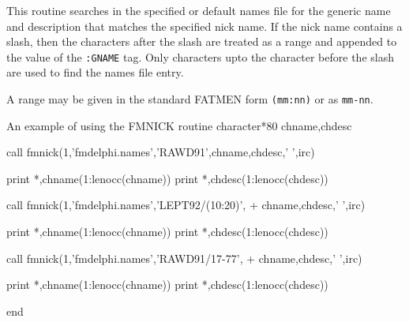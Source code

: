 This routine searches in the specified or default names file
for the generic name and description that matches the specified
nick name. If the nick name contains a slash, then the characters
after the slash are treated as a range and appended to the 
value of the {\tt :GNAME} tag. Only characters upto the character
before the slash are used to find the names file entry.

A range may be given in the standard FATMEN form {\tt (mm:nn)}
or as {\tt mm-nn}.

\begin{XMPt}{An example of using the FMNICK routine}
      character*80 chname,chdesc

      call fmnick(1,'fmdelphi.names','RAWD91',chname,chdesc,' ',irc)

      print *,chname(1:lenocc(chname))
      print *,chdesc(1:lenocc(chdesc))

      call fmnick(1,'fmdelphi.names','LEPT92/(10:20)',
     +            chname,chdesc,' ',irc)

      print *,chname(1:lenocc(chname))
      print *,chdesc(1:lenocc(chdesc))

      call fmnick(1,'fmdelphi.names','RAWD91/17-77',
     +            chname,chdesc,' ',irc)

      print *,chname(1:lenocc(chname))
      print *,chdesc(1:lenocc(chdesc))

      end
\end{XMPt}


